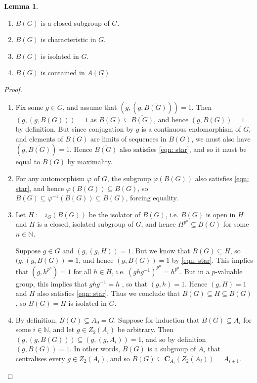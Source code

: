\documentclass[12pt,a4paper]{article}
\theoremstyle{definition}
\newtheorem{lem}[thm]{Lemma}
\theoremstyle{remark}
\theoremstyle{custthm}
\begin{document}
\begin{lem}\label{lem: properties of B}
$ $

\begin{enumerate}[label=(\roman*)]
\item $B(G)$ is a closed subgroup of $G$.
\item $B(G)$ is characteristic in $G$.
\item $B(G)$ is isolated in $G$. 
\item $B(G)$ is contained in $A(G)$.
\end{enumerate}
\end{lem}

\begin{proof}
$ $

\begin{enumerate}[label=(\roman*)]
\item Fix some $g\in G$, and assume that $(g,(g,\overline{B(G)})) = 1$. Then $(g,(g,B(G))) = 1$ as $B(G)\subseteq \overline{B(G)}$, and hence $(g,B(G)) = 1$ by definition. But since conjugation by $g$ is a continuous endomorphism of $G$, and elements of $\overline{B(G)}$ are limits of sequences in $B(G)$, we must also have $(g,\overline{B(G)}) = 1$. Hence $\overline{B(G)}$ also satisfies \eqref{eqn: star}, and so it must be equal to $B(G)$ by maximality.
\item For any automorphism $\varphi$ of $G$, the subgroup $\varphi(B(G))$ also satisfies \eqref{eqn: star}, and hence $\varphi(B(G))\subseteq B(G)$, so $B(G)\subseteq\varphi^{-1}(B(G))\subseteq B(G)$, forcing equality.
\item Let $H:=i_G(B(G))$ be the isolator of $B(G)$, i.e. $B(G)$ is open in $H$ and $H$ is a closed, isolated subgroup of $G$, and hence $H^{p^n}\subseteq B(G)$ for some $n\in\mathbb{N}$. 

Suppose $g\in G$ and $(g,(g,H))=1$. But we know that $B(G)\subseteq H$, so $(g,(g,B(G))=1$, and hence $(g,B(G))=1$ by \eqref{eqn: star}. This implies that $(g,h^{p^n})=1$ for all $h\in H$, i.e. $(ghg^{-1})^{p^n} = h^{p^n}$. But in a $p$-valuable group, this implies that $ghg^{-1} = h$ \cite[Ch. III, 2.1.4]{Laz65}, so that $(g, h) = 1$. Hence $(g,H)=1$ and $H$ also satisfies \eqref{eqn: star}. Thus we conclude that $B(G)\subseteq H\subseteq B(G)$, so $B(G)=H$ is isolated in $G$.
\item By definition, $B(G) \subseteq A_0 = G$. Suppose for induction that $B(G)\subseteq A_i$ for some $i\in\mathbb{N}$, and let $g\in Z_2(A_i)$ be arbitrary. Then $(g,(g,B(G))) \subseteq (g,(g,A_i)) = 1$, and so by definition $(g,B(G)) = 1$. In other words, $B(G)$ is a subgroup of $A_i$ that centralises every $g\in Z_2(A_i)$, and so $B(G) \subseteq \mathbf{C}_{A_i}(Z_2(A_i)) = A_{i+1}$.\qedhere
\end{enumerate}
\end{proof}
\end{document}
